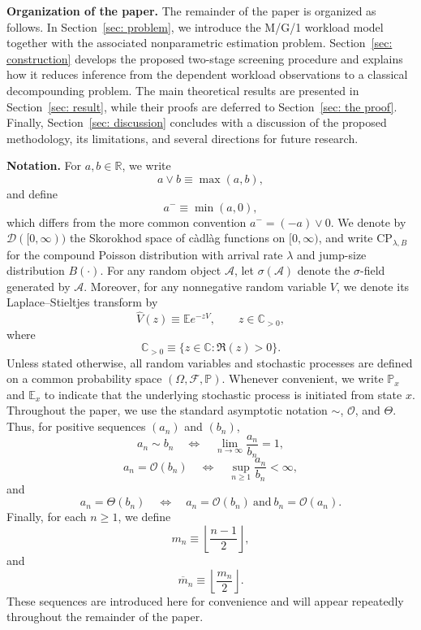 \documentclass[12pt]{article}
\newcommand{\1}{\mathbf{1}}
\begin{document}
\medskip

\noindent\textbf{Organization of the paper.} The remainder of the paper is organized as follows. In Section~\ref{sec: problem}, we introduce the M/G/1 workload model together with the associated nonparametric estimation problem. Section~\ref{sec: construction} develops the proposed two-stage screening procedure and explains how it reduces inference from the dependent workload observations to a classical decompounding problem. The main theoretical results are presented in Section~\ref{sec: result}, while their proofs are deferred to Section~\ref{sec: the proof}. Finally, Section~\ref{sec: discussion} concludes with a discussion of the proposed methodology, its limitations, and several directions for future research.
\medskip

\noindent\textbf{Notation.} For $a,b\in\mathbb{R}$, we write \[ a\vee b\equiv\max(a,b), \] and define \[ a^-\equiv\min(a,0), \] which differs from the more common convention $a^-=(-a)\vee0$. We denote by $\mathcal{D}([0,\infty))$ the Skorokhod space of c\`adl\`ag functions on $[0,\infty)$, and write $\mathrm{CP}_{\lambda,B}$ for the compound Poisson distribution with arrival rate $\lambda$ and jump-size distribution $B(\cdot)$. For any random object $\mathcal A$, let $\sigma(\mathcal A)$ denote the $\sigma$-field generated by $\mathcal A$. Moreover, for any nonnegative random variable $V$, we denote its Laplace--Stieltjes transform by \[ \widehat V(z)\equiv \mathbb Ee^{-zV}, \qquad z\in\mathbb C_{>0}, \] where \[ \mathbb C_{>0}\equiv \{z\in\mathbb C:\Re(z)>0\}. \] Unless stated otherwise, all random variables and stochastic processes are defined on a common probability space $(\Omega,\mathcal F,\mathbb P)$. Whenever convenient, we write $\mathbb P_x$ and $\mathbb E_x$ to indicate that the underlying stochastic process is initiated from state $x$. Throughout the paper, we use the standard asymptotic notation $\sim$, $\mathcal O$, and $\Theta$. Thus, for positive sequences $(a_n)$ and $(b_n)$, \[ a_n\sim b_n \quad\Longleftrightarrow\quad \lim_{n\to\infty}\frac{a_n}{b_n}=1, \] \[ a_n=\mathcal O(b_n) \quad\Longleftrightarrow\quad \sup_{n\ge1}\frac{a_n}{b_n}<\infty, \] and \[ a_n=\Theta(b_n) \quad\Longleftrightarrow\quad a_n=\mathcal O(b_n) \ \text{and}\ b_n=\mathcal O(a_n). \] Finally, for each $n\ge1$, we define \begin{equation}\label{eq:m_n} m_n\equiv \left\lfloor \frac{n-1}{2} \right\rfloor, \end{equation} and \begin{equation}\label{eq:m_bar} \overline m_n\equiv \left\lfloor \frac{m_n}{2} \right\rfloor. \end{equation}
These sequences are introduced here for convenience and will appear repeatedly throughout the remainder of the paper.
\end{document}
